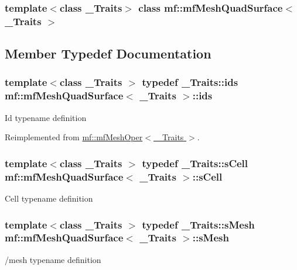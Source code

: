 \subsubsection*{template$<$class \_\-Traits$>$ class mf::mfMeshQuadSurface$<$ \_\-Traits $>$}



\subsection{Member Typedef Documentation}
\hypertarget{classmf_1_1mfMeshQuadSurface_a91f8c5a330192db329f7b2e116b9149d}{
\subsubsection[{ids}]{\setlength{\rightskip}{0pt plus 5cm}template$<$class \_\-Traits $>$ typedef \_\-Traits::ids {\bf mf::mfMeshQuadSurface}$<$ \_\-Traits $>$::{\bf ids}}}
\label{classmf_1_1mfMeshQuadSurface_a91f8c5a330192db329f7b2e116b9149d}
Id typename definition 

Reimplemented from \hyperlink{classmf_1_1mfMeshOper_a526d1466339244781fbdc0dbfe5ad210}{mf::mfMeshOper$<$ \_\-Traits $>$}.

\hypertarget{classmf_1_1mfMeshQuadSurface_a1d1590394548b06c8c8ee3b6a9a7b242}{
\subsubsection[{sCell}]{\setlength{\rightskip}{0pt plus 5cm}template$<$class \_\-Traits $>$ typedef \_\-Traits::sCell {\bf mf::mfMeshQuadSurface}$<$ \_\-Traits $>$::{\bf sCell}}}
\label{classmf_1_1mfMeshQuadSurface_a1d1590394548b06c8c8ee3b6a9a7b242}
Cell typename definition \hypertarget{classmf_1_1mfMeshQuadSurface_a5c71a1c02ec20c5c33393f8bd256168d}{
\subsubsection[{sMesh}]{\setlength{\rightskip}{0pt plus 5cm}template$<$class \_\-Traits $>$ typedef \_\-Traits::sMesh {\bf mf::mfMeshQuadSurface}$<$ \_\-Traits $>$::{\bf sMesh}}}
\label{classmf_1_1mfMeshQuadSurface_a5c71a1c02ec20c5c33393f8bd256168d}
/mesh typename definition 


